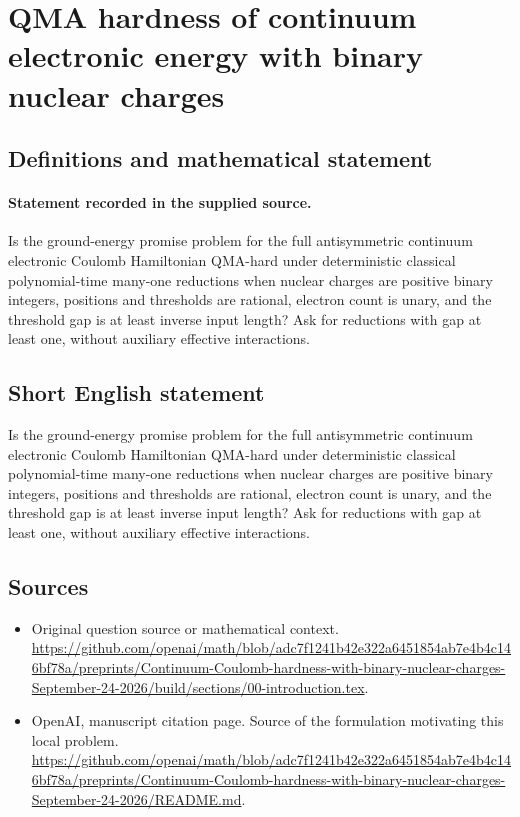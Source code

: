 \documentclass[11pt]{article}
\begin{document}
\section*{QMA hardness of continuum electronic energy with binary nuclear charges}\label{statement}
\subsection{Definitions and mathematical statement}
\paragraph{Statement recorded in the supplied source.}
Is the ground-energy promise problem for the full antisymmetric continuum electronic Coulomb Hamiltonian QMA-hard under deterministic classical polynomial-time many-one reductions when nuclear charges are positive binary integers, positions and thresholds are rational, electron count is unary, and the threshold gap is at least inverse input length? Ask for reductions with gap at least one, without auxiliary effective interactions.
\subsection{Short English statement}
Is the ground-energy promise problem for the full antisymmetric continuum electronic Coulomb Hamiltonian QMA-hard under deterministic classical polynomial-time many-one reductions when nuclear charges are positive binary integers, positions and thresholds are rational, electron count is unary, and the threshold gap is at least inverse input length? Ask for reductions with gap at least one, without auxiliary effective interactions.
\subsection{Sources}
\begin{itemize}
\item[S1] Original question source or mathematical context.
\url{https://github.com/openai/math/blob/adc7f1241b42e322a6451854ab7e4b4c146bf78a/preprints/Continuum-Coulomb-hardness-with-binary-nuclear-charges-September-24-2026/build/sections/00-introduction.tex}.
\item[S2] OpenAI, manuscript citation page. Source of the formulation motivating this local problem.
\url{https://github.com/openai/math/blob/adc7f1241b42e322a6451854ab7e4b4c146bf78a/preprints/Continuum-Coulomb-hardness-with-binary-nuclear-charges-September-24-2026/README.md}.
\end{itemize}
\end{document}
